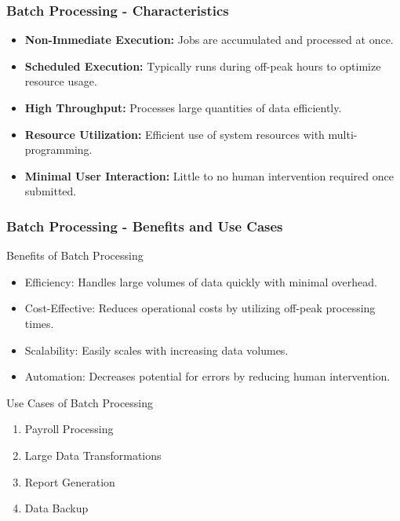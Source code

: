 \documentclass[aspectratio=169]{beamer}
\begin{document}
\begin{frame}[fragile]
    \frametitle{Batch Processing - Characteristics}
    \begin{itemize}
        \item \textbf{Non-Immediate Execution:} Jobs are accumulated and processed at once.
        \item \textbf{Scheduled Execution:} Typically runs during off-peak hours to optimize resource usage.
        \item \textbf{High Throughput:} Processes large quantities of data efficiently.
        \item \textbf{Resource Utilization:} Efficient use of system resources with multi-programming.
        \item \textbf{Minimal User Interaction:} Little to no human intervention required once submitted.
    \end{itemize}
\end{frame}

\begin{frame}[fragile]
    \frametitle{Batch Processing - Benefits and Use Cases}
    \begin{block}{Benefits of Batch Processing}
        \begin{itemize}
            \item Efficiency: Handles large volumes of data quickly with minimal overhead.
            \item Cost-Effective: Reduces operational costs by utilizing off-peak processing times.
            \item Scalability: Easily scales with increasing data volumes.
            \item Automation: Decreases potential for errors by reducing human intervention.
        \end{itemize}
    \end{block}

    \begin{block}{Use Cases of Batch Processing}
        \begin{enumerate}
            \item Payroll Processing
            \item Large Data Transformations
            \item Report Generation
            \item Data Backup
        \end{enumerate}
    \end{block}
\end{frame}
\end{document}
